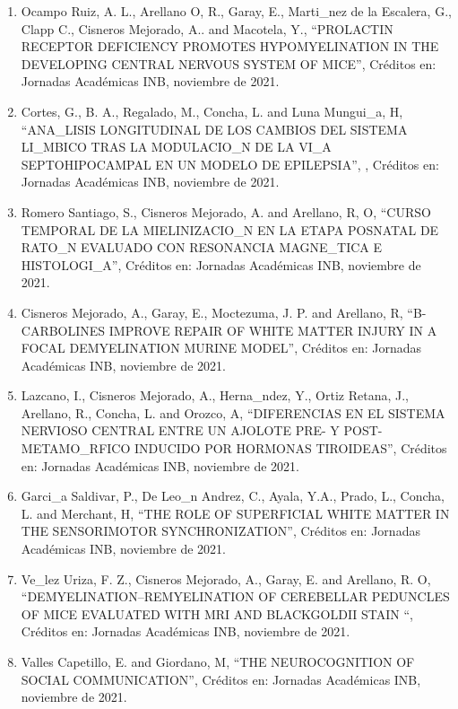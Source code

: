 \begin{enumerate}
\item  Ocampo Ruiz, A. L., Arellano O, R., Garay, E., Marti_nez de la Escalera, G., Clapp C., Cisneros Mejorado, A.. and 
Macotela, Y., “PROLACTIN RECEPTOR DEFICIENCY PROMOTES HYPOMYELINATION IN THE DEVELOPING CENTRAL NERVOUS SYSTEM OF MICE”, 
Créditos
en: Jornadas Académicas INB, noviembre de 2021.

\item  Cortes, G., B. A., Regalado, M., Concha, L. and Luna Mungui_a, H, “ANA_LISIS LONGITUDINAL DE LOS CAMBIOS DEL SISTEMA 
LI_MBICO TRAS LA MODULACIO_N DE LA VI_A SEPTOHIPOCAMPAL EN UN MODELO DE EPILEPSIA”, , Créditos en: Jornadas Académicas INB, 
noviembre de 2021.

\item  Romero Santiago, S., Cisneros Mejorado, A. and Arellano, R, O, “CURSO TEMPORAL DE LA MIELINIZACIO_N EN LA ETAPA 
POSNATAL 
DE RATO_N EVALUADO CON RESONANCIA MAGNE_TICA E HISTOLOGI_A”, Créditos en: Jornadas Académicas INB, noviembre de 2021.

\item  Cisneros Mejorado, A., Garay, E., Moctezuma, J. P. and Arellano, R, “B-CARBOLINES IMPROVE REPAIR OF WHITE MATTER 
INJURY 
IN A FOCAL DEMYELINATION MURINE MODEL”, Créditos en: Jornadas Académicas INB, noviembre de 2021.

\item  Lazcano, I., Cisneros Mejorado, A., Herna_ndez, Y., Ortiz Retana, J., Arellano, R., Concha, L. and Orozco, A, 
“DIFERENCIAS EN EL SISTEMA NERVIOSO CENTRAL ENTRE UN AJOLOTE PRE- Y POST- METAMO_RFICO INDUCIDO POR HORMONAS TIROIDEAS”, 
Créditos en: Jornadas Académicas INB, noviembre de 2021.

\item  Garci_a Saldivar, P., De Leo_n Andrez, C., Ayala, Y.A., Prado, L., Concha, L. and Merchant, H, “THE ROLE OF 
SUPERFICIAL 
WHITE MATTER IN THE SENSORIMOTOR SYNCHRONIZATION”, Créditos en: Jornadas Académicas INB, noviembre de 2021.

\item  Ve_lez Uriza, F. Z., Cisneros Mejorado, A., Garay, E. and Arellano, R. O, “DEMYELINATION–REMYELINATION OF CEREBELLAR 
PEDUNCLES OF MICE EVALUATED WITH MRI AND BLACKGOLDII STAIN “, Créditos en: Jornadas Académicas INB, noviembre de 2021.

\item  Valles Capetillo, E. and Giordano, M, “THE NEUROCOGNITION OF SOCIAL COMMUNICATION”, Créditos en: Jornadas Académicas 
INB, 
noviembre de 2021.


\end{enumerate}
